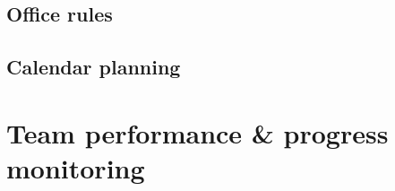 \documentclass[a4paper,11pt]{article}
\begin{document}

\subsection{Office rules} %
\label{subsec:office_rules}


\subsection{Calendar planning} %
\label{subsec:calendar_planning}



\section{Team performance \& progress monitoring} %
\label{sec:team_performance_progress_monitoring}

\end{document}
